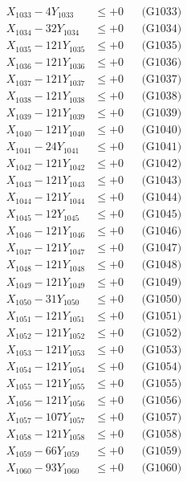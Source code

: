 \documentclass[a4paper,10pt]{article}
\begin{document}
{\begin{align}
X_{1033} - 4Y_{1033} &\leq +0 && \text{(G1033)} \\
X_{1034} - 32Y_{1034} &\leq +0 && \text{(G1034)} \\
X_{1035} - 121Y_{1035} &\leq +0 && \text{(G1035)} \\
X_{1036} - 121Y_{1036} &\leq +0 && \text{(G1036)} \\
X_{1037} - 121Y_{1037} &\leq +0 && \text{(G1037)} \\
X_{1038} - 121Y_{1038} &\leq +0 && \text{(G1038)} \\
X_{1039} - 121Y_{1039} &\leq +0 && \text{(G1039)} \\
X_{1040} - 121Y_{1040} &\leq +0 && \text{(G1040)} \\
\allowbreak
X_{1041} - 24Y_{1041} &\leq +0 && \text{(G1041)} \\
X_{1042} - 121Y_{1042} &\leq +0 && \text{(G1042)} \\
X_{1043} - 121Y_{1043} &\leq +0 && \text{(G1043)} \\
X_{1044} - 121Y_{1044} &\leq +0 && \text{(G1044)} \\
X_{1045} - 12Y_{1045} &\leq +0 && \text{(G1045)} \\
X_{1046} - 121Y_{1046} &\leq +0 && \text{(G1046)} \\
X_{1047} - 121Y_{1047} &\leq +0 && \text{(G1047)} \\
X_{1048} - 121Y_{1048} &\leq +0 && \text{(G1048)} \\
X_{1049} - 121Y_{1049} &\leq +0 && \text{(G1049)} \\
X_{1050} - 31Y_{1050} &\leq +0 && \text{(G1050)} \\
\allowbreak
X_{1051} - 121Y_{1051} &\leq +0 && \text{(G1051)} \\
X_{1052} - 121Y_{1052} &\leq +0 && \text{(G1052)} \\
X_{1053} - 121Y_{1053} &\leq +0 && \text{(G1053)} \\
X_{1054} - 121Y_{1054} &\leq +0 && \text{(G1054)} \\
X_{1055} - 121Y_{1055} &\leq +0 && \text{(G1055)} \\
X_{1056} - 121Y_{1056} &\leq +0 && \text{(G1056)} \\
X_{1057} - 107Y_{1057} &\leq +0 && \text{(G1057)} \\
X_{1058} - 121Y_{1058} &\leq +0 && \text{(G1058)} \\
X_{1059} - 66Y_{1059} &\leq +0 && \text{(G1059)} \\
X_{1060} - 93Y_{1060} &\leq +0 && \text{(G1060)} \\

\end{align}}
\end{document}

